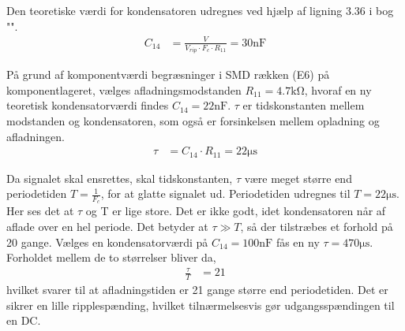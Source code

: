 Den teoretiske værdi for kondensatoren udregnes ved hjælp af ligning 3.36 i bog "\cite[side. 160]{Sedra19uu}".
\begin{align}
	C_{14} & = \frac{V}{V_{rip} \cdot F_c \cdot R_{11}} = 30\si{\nano\farad}
\end{align}


På grund af komponentværdi begræsninger i SMD rækken (E6) på komponentlageret, vælges afladningsmodstanden $R_{11} = 4.7 \si{\kilo\ohm}$, hvoraf en ny teoretisk kondensatorværdi findes $C_{14} = 22 \si{\nano\farad}$.
$\tau$ er tidskonstanten mellem modstanden og kondensatoren, som også er forsinkelsen mellem opladning og afladningen. 
\begin{align}
	\tau & = C_{14} \cdot R_{11} = 22\si{\micro\second}
\end{align}

Da signalet skal ensrettes, skal tidskonstanten, $\tau$ være meget større end periodetiden $T = \frac{1}{F_c}$, for at glatte signalet ud. Periodetiden udregnes til $T = 22 \si{\micro\second}$. Her ses det at $\tau$ og T er lige store. Det er ikke godt, idet kondensatoren når af aflade over en hel periode. Det betyder at $\tau \gg T$, så der tilstræbes et forhold på 20 gange.
Vælges en kondensatorværdi på $C_{14} = 100 \si{\nano\farad}$ fås en ny $\tau = 470\si{\micro\second}$. Forholdet mellem de to størrelser bliver da, 
\begin{align}
	\frac{\tau}{T} & = 21
\end{align}
hvilket svarer til at afladningstiden er 21 gange større end periodetiden. Det er sikrer en lille ripplespænding, hvilket tilnærmelsesvis gør udgangsspændingen til en DC.
